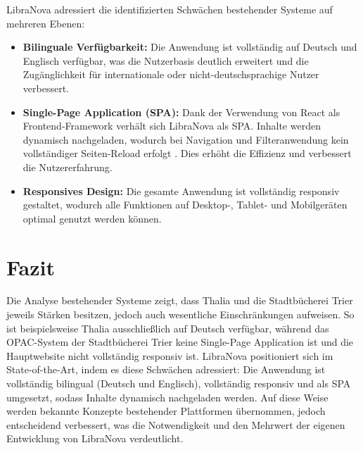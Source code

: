 LibraNova adressiert die identifizierten Schwächen bestehender Systeme auf mehreren Ebenen:  

\begin{itemize}
	\item \textbf{Bilinguale Verfügbarkeit:} Die Anwendung ist vollständig auf Deutsch und Englisch verfügbar, was die Nutzerbasis deutlich erweitert und die Zugänglichkeit für internationale oder nicht-deutschsprachige Nutzer verbessert.
	\item \textbf{Single-Page Application (SPA):} Dank der Verwendung von React als Frontend-Framework verhält sich LibraNova als SPA. Inhalte werden dynamisch nachgeladen, wodurch bei Navigation und Filteranwendung kein vollständiger Seiten-Reload  erfolgt \cite{SPRINGBOOTREACT2025}. Dies erhöht die Effizienz und verbessert die Nutzererfahrung. 
	\item \textbf{Responsives Design:} Die gesamte Anwendung ist vollständig responsiv gestaltet, wodurch alle Funktionen auf Desktop-, Tablet- und Mobilgeräten optimal genutzt werden können.
\end{itemize}

\section{Fazit}

Die Analyse bestehender Systeme zeigt, dass Thalia und die Stadtbücherei Trier jeweils Stärken besitzen, jedoch auch wesentliche Einschränkungen aufweisen. So ist beispielsweise Thalia ausschließlich auf Deutsch verfügbar, während das OPAC-System der Stadtbücherei Trier keine Single-Page Application ist und die Hauptwebsite nicht vollständig responsiv ist. LibraNova positioniert sich im State-of-the-Art, indem es diese Schwächen adressiert: Die Anwendung ist vollständig bilingual (Deutsch und Englisch), vollständig responsiv und als SPA umgesetzt, sodass Inhalte dynamisch nachgeladen werden. Auf diese Weise werden bekannte Konzepte bestehender Plattformen übernommen, jedoch entscheidend verbessert, was die Notwendigkeit und den Mehrwert der eigenen Entwicklung von LibraNova verdeutlicht.
